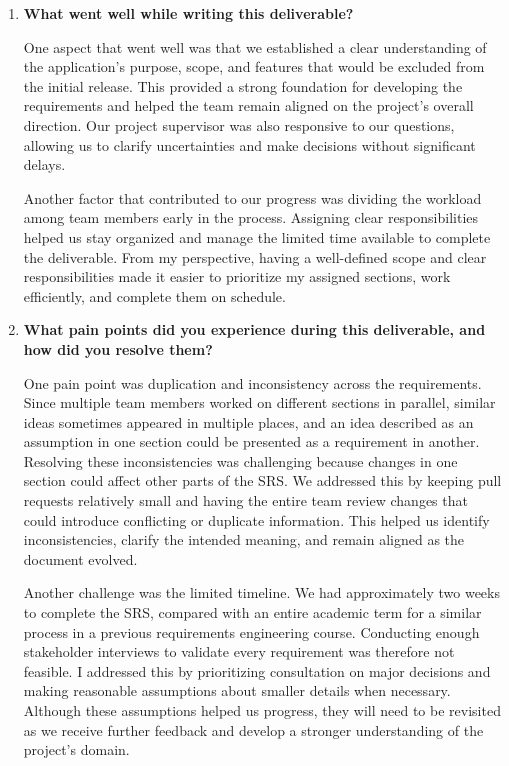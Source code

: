 \documentclass[12pt]{article}
\begin{document}
\begin{enumerate}
    \item \textbf{What went well while writing this deliverable?}

    One aspect that went well was that we established a clear understanding
    of the application's purpose, scope, and features that would be excluded
    from the initial release. This provided a strong foundation for developing
    the requirements and helped the team remain aligned on the project's
    overall direction. Our project supervisor was also responsive to our
    questions, allowing us to clarify uncertainties and make decisions without
    significant delays.

    Another factor that contributed to our progress was dividing the workload
    among team members early in the process. Assigning clear responsibilities
    helped us stay organized and manage the limited time available to complete
    the deliverable. From my perspective, having a well-defined scope and clear
    responsibilities made it easier to prioritize my assigned sections, work
    efficiently, and complete them on schedule.

    \item \textbf{What pain points did you experience during this
    deliverable, and how did you resolve them?}

    One pain point was duplication and inconsistency across the
    requirements. Since multiple team members worked on different
    sections in parallel, similar ideas sometimes appeared in multiple
    places, and an idea described as an assumption in one section
    could be presented as a requirement in another. Resolving these
    inconsistencies was challenging because changes in one section
    could affect other parts of the SRS. We addressed this by keeping
    pull requests relatively small and
    having the entire team review changes that could introduce
    conflicting or duplicate information. This helped us identify
    inconsistencies, clarify the intended meaning, and remain aligned
    as the document evolved.

    Another challenge was the limited timeline. We had approximately
    two weeks to complete the SRS, compared with an entire academic
    term for a similar process in a previous requirements engineering
    course. Conducting enough stakeholder interviews to validate
    every requirement was therefore not feasible. I addressed this
    by prioritizing consultation on major decisions and making
    reasonable assumptions about smaller details when necessary.
    Although these assumptions helped us progress, they will need
    to be revisited as we receive further feedback and develop a
    stronger understanding of the project's domain.


\end{enumerate}
\end{document}
